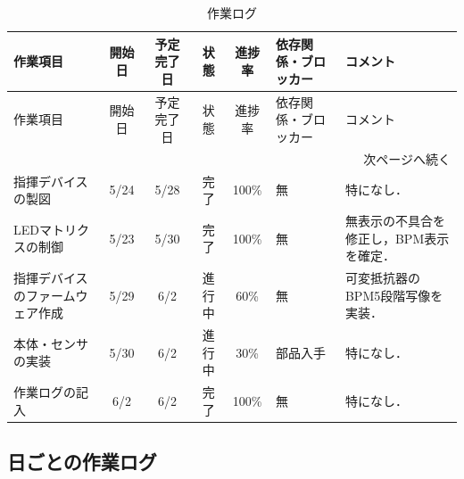 \documentclass[uplatex,dvipdfmx,a4paper,11pt]{jsarticle}
\begin{document}
\begin{longtable}{|p{3cm}|c|c|c|c|p{3.5cm}|p{4cm}|}
\caption{作業ログ} \\
\hline
作業項目 & 開始日 & 予定完了日 & 状態 & 進捗率 & 依存関係・ブロッカー & コメント \\
\hline
\endfirsthead

\hline
作業項目 & 開始日 & 予定完了日 & 状態 & 進捗率 & 依存関係・ブロッカー & コメント \\
\hline
\endhead

\hline
\multicolumn{7}{r}{次ページへ続く} \\
\hline
\endfoot

\hline
\endlastfoot

指揮デバイスの製図 &
5/24 &
5/28 &
完了 &
100\% &
無 &
特になし． \\
\hline

LEDマトリクスの制御 &
5/23 &
5/30 &
完了 &
100\% &
無 &
無表示の不具合を修正し，BPM表示を確定． \\
\hline

指揮デバイスのファームウェア作成 &
5/29 &
6/2 &
進行中 &
60\% &
無 &
可変抵抗器のBPM5段階写像を実装． \\
\hline

本体・センサの実装 &
5/30 &
6/2 &
進行中 &
30\% &
部品入手 &
特になし． \\
\hline

作業ログの記入 &
6/2 &
6/2 &
完了 &
100\% &
無 &
特になし． \\
\hline



\end{longtable}


\subsection{日ごとの作業ログ}


    \renewcommand{\arraystretch}{1.2}

    \small
\end{document}
